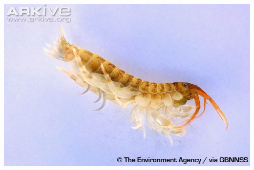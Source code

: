 \documentclass[12pt,letterpaper]{amsart}
\theoremstyle{plain}
\theoremstyle{definition}
\numberwithin{equation}{section}
\begin{document}
\includegraphics[scale=0.75]{shrimpy3}
\end{document}
